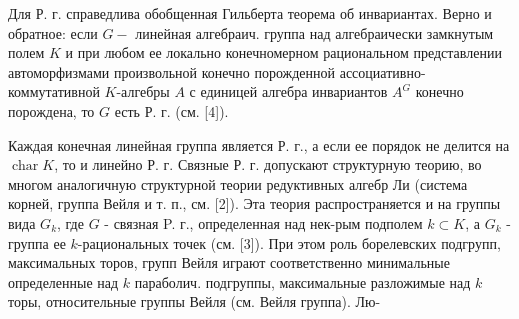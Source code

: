 \documentclass[10pt]{article}
\begin{document}
Для Р. г. справедлива обобщенная Гильберта теорема об инвариантах. Верно и обратное: если $G-$ линейная алгебраич. группа над алгебраически замкнутым полем $K$ и при любом ее локально конечномерном рациональном представлении автоморфизмами произвольной конечно порожденной ассоциативно-коммутативной $K$-алгебры $A$ с единицей алгебра инвариантов $A^{G}$ конечно порождена, то $G$ есть Р. г. (см. [4]).



Каждая конечная линейная группа является Р. г., а если ее порядок не делится на $\operatorname{char} K$, то и линейно Р. г. Связные Р. г. допускают структурную теорию, во многом аналогичную структурной теории редуктивных алгебр Ли (система корней, группа Вейля и т. п., см. [2]). Эта теория распространяется и на группы вида $G_{k}$, где $G$ - связная P. г., определенная над нек-рым подполем $k \subset K$, а $G_{k}$ - группа ее $k$-рациональных точек (см. [3]). При этом роль борелевских подгрупп, максимальных торов, групп Вейля играют соответственно минимальные определенные над $k$ параболич. подгруппы, максимальные разложимые над $k$ торы, относительные группы Вейля (см. Вейля группа). Лю-
\end{document}
